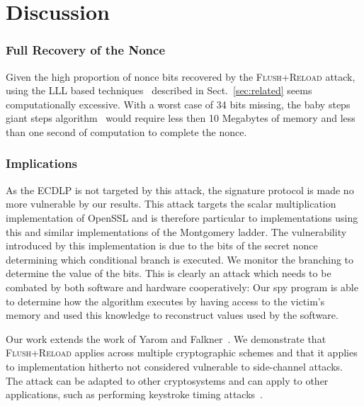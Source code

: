 \documentclass[twocolumn]{svjour3}
\begin{document}
\section{Discussion}\label{sec:discussion}

\subsubsection*{Full Recovery of the Nonce}\label{sub:full_nonce}
Given the high proportion of nonce bits recovered by the \textsc{Flush+Reload} attack, using the LLL based techniques~\cite{Howgrave-GrahamS01,nguyen03insecurity} described in Sect.~\ref{sec:related} seems computationally excessive. 
With a worst case of 34 bits missing, the baby steps giant steps algorithm~\cite{shanks71class} would require less then 10 Megabytes of memory
and less than one second of computation to complete the nonce.


\subsubsection*{Implications}

As the ECDLP is not targeted by this attack, the signature protocol is made no more vulnerable by our results. 
This attack targets the scalar multiplication implementation of OpenSSL and is therefore particular to implementations using this and similar implementations of the Montgomery ladder. The vulnerability introduced by this implementation is due to the bits of the secret nonce determining which conditional branch is executed. We monitor the branching to determine the value of the bits. This is clearly an attack which needs to be combated by both software and hardware cooperatively: Our spy program is able to determine how the algorithm executes by having access to the victim's memory and used this knowledge to reconstruct values used by the software.

Our work extends the work of Yarom and Falkner~\cite{yarom13flush}.
We demonstrate that \textsc{Flush+Reload} applies across multiple cryptographic schemes and that it applies
to implementation hitherto not considered vulnerable to side-channel attacks.
The attack can be adapted to other cryptosystems and can apply to other applications, such as performing keystroke timing attacks~\cite{song01timing,ristenpart09hey}.
\end{document}
